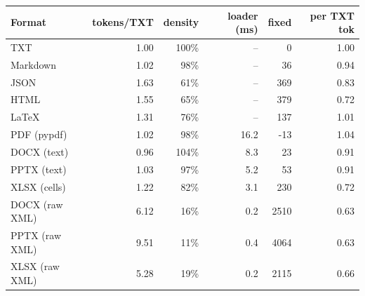 \begin{tabular}{lrrrrr}
\toprule
Format & tokens/TXT & density & loader (ms) & fixed & per TXT tok \\
\midrule
TXT & 1.00 & 100\% & -- & 0 & 1.00 \\
Markdown & 1.02 & 98\% & -- & 36 & 0.94 \\
JSON & 1.63 & 61\% & -- & 369 & 0.83 \\
HTML & 1.55 & 65\% & -- & 379 & 0.72 \\
LaTeX & 1.31 & 76\% & -- & 137 & 1.01 \\
PDF (pypdf) & 1.02 & 98\% & 16.2 & -13 & 1.04 \\
DOCX (text) & 0.96 & 104\% & 8.3 & 23 & 0.91 \\
PPTX (text) & 1.03 & 97\% & 5.2 & 53 & 0.91 \\
XLSX (cells) & 1.22 & 82\% & 3.1 & 230 & 0.72 \\
DOCX (raw XML) & 6.12 & 16\% & 0.2 & 2510 & 0.63 \\
PPTX (raw XML) & 9.51 & 11\% & 0.4 & 4064 & 0.63 \\
XLSX (raw XML) & 5.28 & 19\% & 0.2 & 2115 & 0.66 \\
\bottomrule
\end{tabular}
